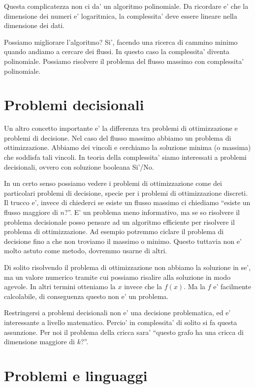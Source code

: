 Questa complicatezza non ci da' un algoritmo polinomiale. Da ricordare e' che la dimensione dei
numeri e' logaritmica, la complessita' deve essere lineare nella dimensione dei dati.

Possiamo migliorare l'algoritmo? Si', facendo una ricerca di cammino minimo quando andiamo a cercare
dei flussi. In questo caso la complessita' diventa polinomiale. Possiamo risolvere il problema del
flusso massimo con complessita' polinomiale.

\section{Problemi decisionali}

Un altro concetto importante e' la differenza tra problemi di ottimizzazione e problemi di
decisione. Nel caso del flusso massimo abbiamo un problema di ottimizzazione. Abbiamo dei vincoli e
cerchiamo la soluzione minima (o massima) che soddisfa tali vincoli. In teoria della complessita'
siamo interessati a problemi decisionali, ovvero con soluzione booleana Si'/No.

In un certo senso possiamo vedere i problemi di ottimizzazione come dei particolari problemi di
decisione, specie per i problemi di ottimizzazione discreti. Il trucco e', invece di chiederci se
esiste un flusso massimo ci chiediamo ``esiste un flusso maggiore di $n$?''. E' un problema meno
informativo, ma se so risolvere il problema decisionale posso pensare ad un algoritmo efficiente per
risolvere il problema di ottimizzazione. Ad esempio potremmo ciclare il problema di decisione fino a
che non troviamo il massimo o minimo. Questo tuttavia non e' molto astuto come metodo, dovremmo
usarne di altri.

Di solito risolvendo il problema di ottimizzazione non abbiamo la soluzione in se', ma un valore
numerico tramite cui possiamo risalire alla soluzione in modo agevole. In altri termini otteniamo la
$x$ invece che la $f(x)$. Ma la $f$ e' facilmente calcolabile, di conseguenza questo non e' un
problema.

Restringersi a problemi decisionali non e' una decisione problematica, ed e' interessante a livello
matematico. Percio' in complessita' di solito si fa questa assunzione. Per noi il problema della
cricca sara' ``questo grafo ha una cricca di dimensione maggiore di $k$?''.

\section{Problemi e linguaggi}


